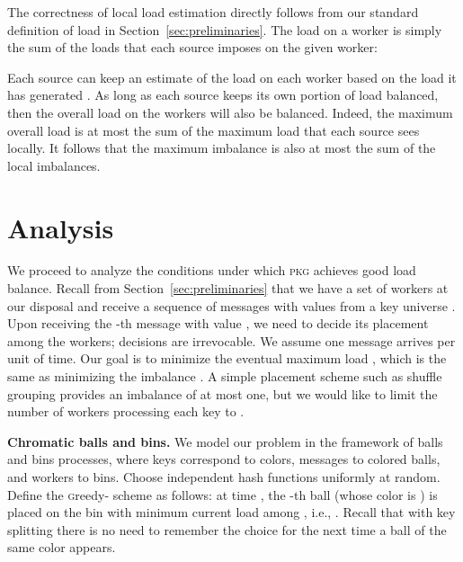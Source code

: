 \documentclass[10pt,conference,letterpaper]{IEEEtran}
\newcommand{\spara}[1]{\smallskip\noindent\textbf{#1}}
\newcommand{\pkgs}{\textsc{pkg}\xspace}
\newcommand{\workers}{\ensuremath{\mathcal{W}}\xspace}
\newcommand{\keyspace}{\ensuremath{\mathcal{K}}\xspace}
\begin{document}
The correctness of local load estimation directly follows from our standard definition of load in Section~\ref{sec:preliminaries}.
The load on a worker  is simply the sum of the loads that each source  imposes on the given worker:

Each source  can keep an estimate of the load on each worker  based on the load it has generated . As long as each source keeps its own portion of load balanced, then the overall load on the workers will also be balanced.
Indeed, the maximum overall load is at most the sum of the maximum load that each source sees locally. 
It follows that the maximum imbalance is also at most the sum of the local imbalances. 



 \section{Analysis}
\label{sec:theory}

\newcommand{\naturals}{{\mathbb N}}
\DeclareRobustCommand{\calA}[0]{{\mathcal A}}
\DeclareRobustCommand{\calP}[0]{{\mathcal P}}
\DeclareRobustCommand{\calQ}[0]{{\mathcal Q}}
\DeclareRobustCommand{\calD}[0]{{\mathcal D}}
\DeclareRobustCommand{\calS}[0]{{\workers}}
\DeclareRobustCommand{\calK}[0]{{\keyspace}}
\newcommand{\code}[1]{{\textsc #1}}
\newcommand{\indic}{\mathbb{I}\,}




We proceed to analyze the conditions under which \pkgs achieves good load balance.
Recall from Section~\ref{sec:preliminaries} that we have a set  of  workers at our disposal and receive a sequence of  messages   with values from a key universe . Upon receiving the -th message with value , we need to decide its placement among the workers; decisions are irrevocable. We assume one message arrives per unit of time.
Our goal is to minimize the eventual maximum load , which is the same as minimizing the imbalance .
A simple placement scheme such as shuffle grouping provides an imbalance of at most one, but
we would like to limit the number of workers processing each key to .


\spara{Chromatic balls and bins.}
We model our problem in the framework of balls and bins processes, where keys correspond to colors, messages to colored balls, and workers to bins.
Choose
  independent hash
functions  uniformly at random. Define the \code{greedy-} scheme as follows:
at time , the -th ball (whose color is ) is placed on the bin with minimum current load among
, i.e., .
Recall that with key splitting there is no need to remember the choice for the next time a ball of the same color appears.
\end{document}
